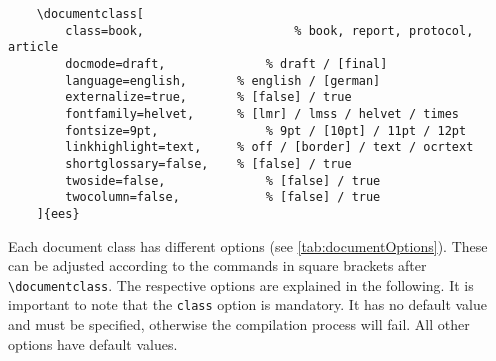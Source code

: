 \begin{lstlisting}[caption={Choosing the Document Class}]
	%%%----- Document class ------------------------------
	\documentclass[
		class=book, 					% book, report, protocol, article
		docmode=draft, 				% draft / [final]
		language=english, 		% english / [german]
		externalize=true, 		% [false] / true
		fontfamily=helvet, 		% [lmr] / lmss / helvet / times
		fontsize=9pt, 				% 9pt / [10pt] / 11pt / 12pt
		linkhighlight=text, 	% off / [border] / text / ocrtext
		shortglossary=false, 	% [false] / true
		twoside=false, 				% [false] / true
		twocolumn=false, 			% [false] / true
	]{ees}
\end{lstlisting}


Each document class has different options (see \autoref{tab:documentOptions}). These can be adjusted according to the commands in square brackets after \lstinline|\documentclass|. The respective options are explained in the following. It is important to note that the \texttt{class} option is mandatory. It has no default value and must be specified, otherwise the compilation process will fail. All other options have default values. 

